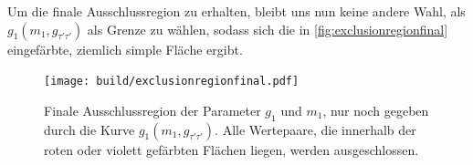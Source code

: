 Um die finale Ausschlussregion zu erhalten, bleibt uns nun keine andere Wahl, als $g_1(m_1,g_{\tau'\tau'})$ als Grenze zu wählen, sodass sich die in \autoref{fig:exclusionregionfinal} eingefärbte, ziemlich simple Fläche ergibt.

\begin{figure}[H]
    \centering
    \texttt{[image: build/exclusionregionfinal.pdf]}
    \caption{Finale Ausschlussregion der Parameter $g_1$ und $m_1$, nur noch gegeben durch die Kurve $g_1(m_1, g_{\tau'\tau'})$. Alle Wertepaare, die innerhalb der roten oder violett gefärbten Flächen liegen, werden ausgeschlossen.}
    \label{fig:exclusionregionfinal}
\end{figure}


